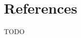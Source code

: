 \documentclass[a4paper,USenglish,cleveref, autoref]{lipics-v2019}
\theoremstyle{definition}
\begin{document}

  

\section{References}
TODO
\end{document}
